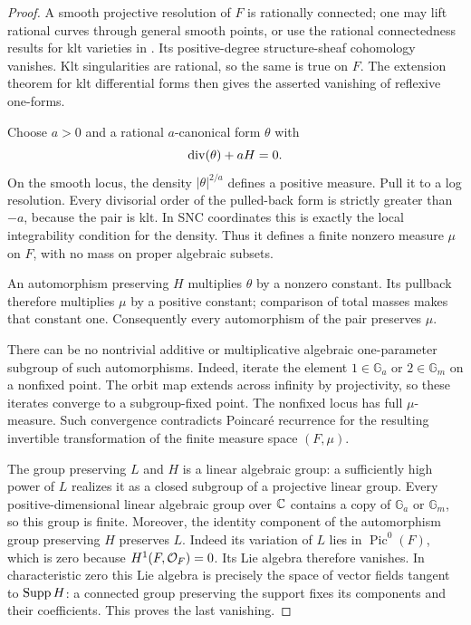 \begin{proof}
A smooth projective resolution of $F$ is rationally connected; one
may lift rational curves through general smooth points, or use the
rational connectedness results for klt varieties in \cite{HM}.
Its positive-degree structure-sheaf cohomology vanishes.  Klt
singularities are rational, so the same is true on $F$.  The
extension theorem for klt differential forms \cite{GKKP} then gives
the asserted vanishing of reflexive one-forms.

Choose $a>0$ and a rational $a$-canonical form $\theta$ with
\[
                         \operatorname{div}(\theta)+aH=0.
\]
On the smooth locus, the density $|\theta|^{2/a}$ defines a positive
measure.  Pull it to a log resolution.  Every divisorial order of
the pulled-back form is strictly greater than $-a$, because the pair
is klt.  In SNC coordinates this is exactly the local integrability
condition for the density.  Thus it defines a finite nonzero measure
$\mu$ on $F$, with no mass on proper algebraic subsets.

An automorphism preserving $H$ multiplies $\theta$ by a nonzero
constant.  Its pullback therefore multiplies $\mu$ by a positive
constant; comparison of total masses makes that constant one.
Consequently every automorphism of the pair preserves $\mu$.

There can be no nontrivial additive or multiplicative algebraic
one-parameter subgroup of such automorphisms.  Indeed, iterate the
element $1\in\mathbb G_a$ or $2\in\mathbb G_m$ on a nonfixed
point.  The orbit map extends across infinity by projectivity, so
these iterates converge to a subgroup-fixed point.  The nonfixed
locus has full $\mu$-measure.  Such convergence contradicts
Poincar\'e recurrence for the resulting invertible transformation of
the finite measure space $(F,\mu)$.

The group preserving $L$ and $H$ is a linear algebraic group: a
sufficiently high power of $L$ realizes it as a closed subgroup of a
projective linear group.  Every positive-dimensional linear
algebraic group over $\mathbb C$ contains a copy of $\mathbb G_a$ or
$\mathbb G_m$, so this group is finite.  Moreover, the identity
component of the automorphism group preserving $H$ preserves $L$.
Indeed its variation of $L$ lies in $\operatorname{Pic}^0(F)$,
which is zero because $H^1(F,\mathcal O_F)=0$.  Its Lie algebra therefore
vanishes.  In characteristic zero this Lie algebra is precisely the
space of vector fields tangent to $\operatorname{Supp} H$: a connected group
preserving the support fixes its components and their coefficients.
This proves the last vanishing.
\end{proof}

